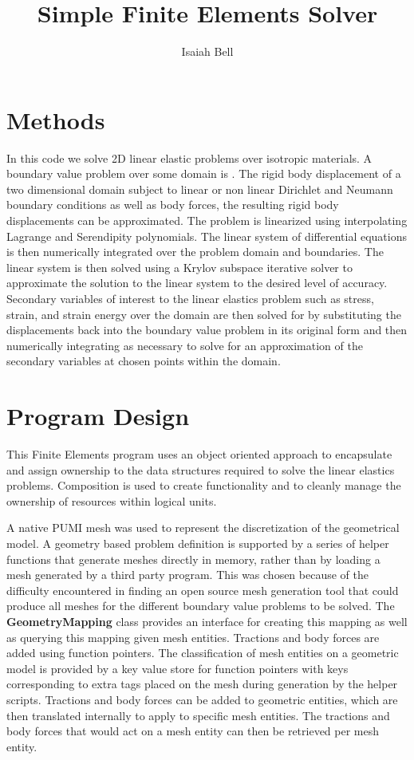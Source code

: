 \documentclass{article}
\begin{document}
\title{Simple Finite Elements Solver}
\author{Isaiah Bell} 
\maketitle

\section{Methods}

In this code we solve 2D linear elastic problems over isotropic materials. A boundary value problem over some domain is . The rigid body displacement of a two dimensional domain subject to linear or non linear Dirichlet and Neumann boundary conditions as well as body forces, the resulting rigid body displacements can be approximated. The problem is linearized using interpolating Lagrange and Serendipity polynomials. The linear system of differential equations is then numerically integrated over the problem domain and boundaries. The linear system is then solved using a Krylov subspace iterative solver to approximate the solution to the linear system to the desired level of accuracy. Secondary variables of interest to the linear elastics problem such as stress, strain, and strain energy over the domain are then solved for by substituting the displacements back into the boundary value problem in its original form and then numerically integrating as necessary to solve for an approximation of the secondary variables at chosen points within the domain.


\section{Program Design}
This Finite Elements program uses an object oriented approach to encapsulate and assign ownership to the data structures required to solve the linear elastics problems. Composition is used to create functionality and to cleanly manage the ownership of resources within logical units.

A native PUMI mesh was used to represent the discretization of the geometrical model. A geometry based problem definition is supported by a series of helper functions that generate meshes directly in memory, rather than by loading a mesh generated by a third party program. This was chosen because of the difficulty encountered in finding an open source mesh generation tool that could produce all meshes for the different boundary value problems to be solved. The \textbf{GeometryMapping} class provides an interface for creating this mapping as well as querying this mapping given mesh entities. Tractions and body forces are added using function pointers. The classification of mesh entities on a geometric model is provided by a key value store for function pointers with keys corresponding to extra tags placed on the mesh during generation by the helper scripts. Tractions and body forces can be added to geometric entities, which are then translated internally to apply to specific mesh entities. The tractions and body forces that would act on a mesh entity can then be retrieved per mesh entity.
\end{document}
